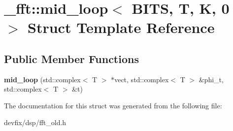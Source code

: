\hypertarget{struct__fft_1_1mid__loop_3_01BITS_00_01T_00_01K_00_010_01_4}{}\section{\+\_\+fft\+:\+:mid\+\_\+loop$<$ B\+I\+TS, T, K, 0 $>$ Struct Template Reference}
\label{struct__fft_1_1mid__loop_3_01BITS_00_01T_00_01K_00_010_01_4}
\subsection*{Public Member Functions}
\begin{DoxyCompactItemize}
\item 
\mbox{\label{struct__fft_1_1mid__loop_3_01BITS_00_01T_00_01K_00_010_01_4_a506e32148fe5d9455de2d522c906e22a}} 
{\bfseries mid\+\_\+loop} (std\+::complex$<$ T $>$ $\ast$vect, std\+::complex$<$ T $>$ \&phi\+\_\+t, std\+::complex$<$ T $>$ \&t)
\end{DoxyCompactItemize}


The documentation for this struct was generated from the following file\+:\begin{DoxyCompactItemize}
\item 
devfix/dsp/fft\+\_\+old.\+h\end{DoxyCompactItemize}
